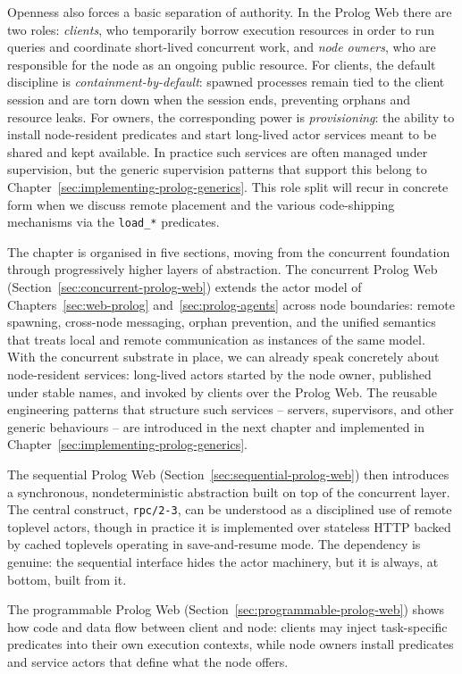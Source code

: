 Openness also forces a basic separation of authority. In the Prolog
Web there are two roles: \emph{clients}, who temporarily borrow
execution resources in order to run queries and coordinate
short-lived concurrent work, and \emph{node owners}, who are
responsible for the node as an ongoing public resource. For clients,
the default discipline is \textit{containment-by-default}: spawned processes
remain tied to the client session and are torn down when the session
ends, preventing orphans and resource leaks. For owners, the
corresponding power is \textit{provisioning}: the ability to install
node-resident predicates and start long-lived actor services meant
to be shared and kept available. In practice such services are often
managed under supervision, but the generic supervision patterns that
support this belong to Chapter~\ref{sec:implementing-prolog-generics}.
This role split will recur in concrete form when we discuss remote
placement and the various code-shipping mechanisms via the
\texttt{load\_*} predicates.

The chapter is organised in five sections, moving from the concurrent
foundation through progressively higher layers of abstraction. The
concurrent Prolog Web
(Section~\ref{sec:concurrent-prolog-web}) extends the actor model
of Chapters~\ref{sec:web-prolog} and~\ref{sec:prolog-agents} across
node boundaries: remote spawning, cross-node messaging, orphan
prevention, and the unified semantics that treats local and remote
communication as instances of the same model. With the concurrent
substrate in place, we can already speak concretely about node-resident
services: long-lived actors started by the node owner, published under
stable names, and invoked by clients over the Prolog Web. The reusable
engineering patterns that structure such services -- servers,
supervisors, and other generic behaviours -- are introduced in the
next chapter and implemented in Chapter~\ref{sec:implementing-prolog-generics}.

The sequential Prolog Web
(Section~\ref{sec:sequential-prolog-web}) then introduces a
synchronous, nondeterministic abstraction built on top of the
concurrent layer. The central construct, \texttt{rpc/2-3}, can be
understood as a disciplined use of remote toplevel actors, though
in practice it is implemented over stateless HTTP backed by cached
toplevels operating in save-and-resume mode. The dependency is
genuine: the sequential interface hides the actor machinery, but it
is always, at bottom, built from it.

The programmable Prolog Web
(Section~\ref{sec:programmable-prolog-web}) shows how code and data
flow between client and node: clients may inject task-specific
predicates into their own execution contexts, while node owners
install predicates and service actors that define what the node
offers.

